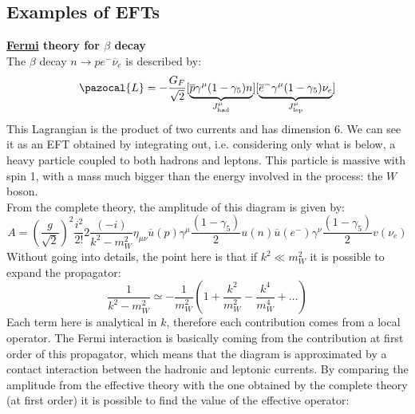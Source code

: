 \documentclass[../main.tex]{subfiles}
\begin{document}
\subsection{Examples of EFTs}
\begin{example}\textbf{\href{https://en.wikipedia.org/wiki/Enrico_Fermi}{Fermi} theory for $\beta$ decay}\\
The $\beta$ decay $n\to pe^-\overline{\nu}_e$ is described by:
\[
\pazocal{L}=-\frac{G_F}{\sqrt{2}}[\underbrace{\overline{p}\gamma^\mu(1-\gamma_5)n}_{J^{\mu}_{\text{had}}}][\underbrace{\overline{e}^-\gamma^\mu(1-\gamma_5)\nu_e}_{J^{\mu}_{\text{lep}}}]
\]
This Lagrangian is the product of two currents and has dimension 6. We can see it as an EFT obtained by integrating out, i.e. considering only what is below, a heavy particle coupled to both hadrons and leptons. This particle is massive with spin 1, with a mass much bigger than the energy involved in the process: the $W$ boson.\\
From the complete theory, the amplitude of this diagram is given by:
\[
A=\left(\frac{g}{\sqrt{2}}\right)^2\frac{i^2}{2!}2\frac{(-i)}{k^2-m_W^2}\eta_{\mu\nu}\overline{u}(p)\gamma^\mu\frac{(1-\gamma_5)}{2}u(n)\overline{u}(e^-)\gamma^\nu\frac{(1-\gamma_5)}{2}v(\nu_e)
\]
Without going into details, the point here is that if $k^2\ll m_W^2$ it is possible to expand the propagator:
\[
\frac{1}{k^2-m_W^2}\simeq-\frac{1}{m_W^2}\left(1+\frac{k^2}{m_W^2}-\frac{k^4}{m_W^4}+\dots\right)
\]
Each term here is analytical in $k$, therefore each contribution comes from a local operator. The Fermi interaction is basically coming from the contribution at first order of this propagator, which means that the diagram is approximated by a contact interaction between the hadronic and leptonic currents. By comparing the amplitude from the effective theory with the one obtained by the complete theory (at first order) it is possible to find the value of the effective operator:

\end{example}
\end{document}
